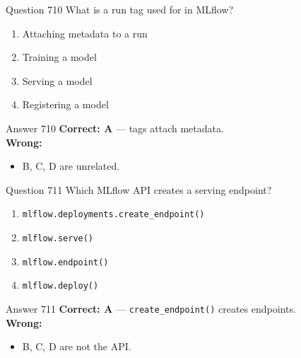 \documentclass[aspectratio=169,11pt]{beamer}
\begin{document}
	\begin{frame}{Question 710}
		What is a run tag used for in MLflow?
		\begin{enumerate}[label=\Alph*.]
			\item Attaching metadata to a run
			\item Training a model
			\item Serving a model
			\item Registering a model
		\end{enumerate}
	\end{frame}
	\begin{frame}{Answer 710}
		\textbf{Correct: A} --- tags attach metadata.\\
		\vspace{0.5em}
		\textbf{Wrong:}
		\begin{itemize}
			\item B, C, D are unrelated.
		\end{itemize}
	\end{frame}
	
	\begin{frame}{Question 711}
		Which MLflow API creates a serving endpoint?
		\begin{enumerate}[label=\Alph*.]
			\item \texttt{mlflow.deployments.create\_endpoint()}
			\item \texttt{mlflow.serve()}
			\item \texttt{mlflow.endpoint()}
			\item \texttt{mlflow.deploy()}
		\end{enumerate}
	\end{frame}
	\begin{frame}{Answer 711}
		\textbf{Correct: A} --- \texttt{create\_endpoint()} creates endpoints.\\
		\vspace{0.5em}
		\textbf{Wrong:}
		\begin{itemize}
			\item B, C, D are not the API.
		\end{itemize}
	\end{frame}
	
\end{document}

